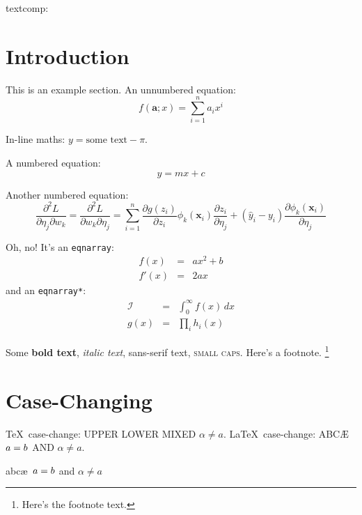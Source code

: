 \documentclass{article}
\newcommand*{\pfrac}[2]{\frac{\partial#1}{\partial#2}}
\newcommand*{\dpfrac}[3]{\frac{\partial^2#1}{\partial#2\partial#3}}
\renewcommand*{\vec}[1]{\boldsymbol{#1}} \newtoks\mytoks \mytoks={token register contents}
\begin{document}



textcomp: \texttwosuperior\ \texteuro 


\section{Introduction} 
\label{sec:intro} 

This is an example section. An unnumbered equation: \[ f(\vec{a}; x) = \sum_{i=1}^n a_i x^i \] 

In-line maths: $y = \text{some text} - \pi$. 

A numbered equation: 
\begin{equation} y = m x + c 
\label{eq:mx+c} 
\end{equation} 

Another numbered equation: 
\begin{equation}
\label{eq:dp} \dpfrac{L}{\eta_j}{w_k} = \dpfrac{L}{w_k}{\eta_j} = \sum_{i=1}^n \pfrac{g(z_i)}{z_i} \phi_k(\vec{x}_i)\pfrac{z_i}{\eta_j} + (\hat{y}_i - y_i)\pfrac{\phi_k(\vec{x}_i)}{\eta_j} 
\end{equation} 

Oh, no! It's an \texttt{eqnarray}: 
\begin{eqnarray} f(x) &=& ax^2 +b
\label{eq:f}\\ f'(x) &=& 2ax
\label{eq:df} 
\end{eqnarray} and an \texttt{eqnarray*}: 
\begin{eqnarray*} \mathcal{I} &= &\int_0^\infty f(x)\,dx\\ g(x) &= &\prod_i h_i(x) 
\end{eqnarray*} 

Some \textbf{bold text}, \textit{italic text}, \textsf{sans-serif text}, \textsc{small caps}. Here's a footnote.
\footnote{Here's the footnote text.} 


\section{Case-Changing} 
\label{sec:casechange} 

\TeX\ case-change: \uppercase{upper \lowercase{LOWER} MiXeD $\alpha \neq a$.} \LaTeX\ case-change: \MakeUppercase{abc\ae\ \protect\( a = b \protect\) and $\alpha \neq a$}. 

{abc\ae\ \protect\( a = b \protect\) and $\alpha \neq a$} 
\end{document}
